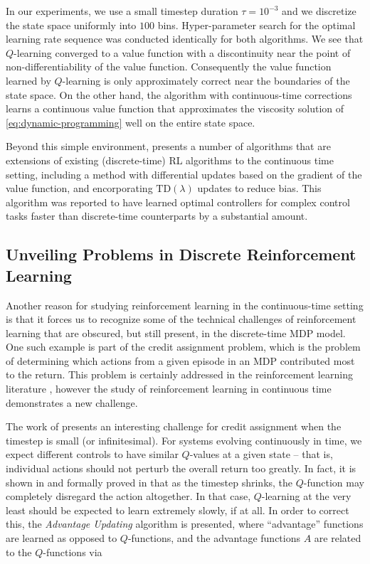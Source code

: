 In our experiments, we use a small timestep duration $\tau=10^{-3}$
and we discretize the state space uniformly into $100$
bins. Hyper-parameter search for the optimal learning rate sequence
was conducted identically for both algorithms. We see that
$Q$-learning converged to a value function with a discontinuity near
the point of non-differentiability of the value function. Consequently
the value function learned by $Q$-learning is only approximately
correct near the boundaries of the state space. On the other hand, the
algorithm with continuous-time corrections learns a continuous value
function that approximates the viscosity solution of
\eqref{eq:dynamic-programming} well on the entire state space.

Beyond this simple environment, \citet{doya2000reinforcement} presents
a number of algorithms that are extensions of existing (discrete-time)
RL algorithms to the continuous time setting, including a method with
differential updates based on the gradient of the value function, and
encorporating $\text{TD}(\lambda)$ updates \citep{sutton1988learning}
to reduce bias. This algorithm was reported to have learned optimal
controllers for complex control tasks faster than discrete-time
counterparts by a substantial amount.

\subsection{Unveiling Problems in Discrete Reinforcement Learning}
Another reason for studying reinforcement learning in the
continuous-time setting is that it forces us to recognize some of the
technical challenges of reinforcement learning that are obscured, but
still present, in the discrete-time MDP model. One such example is 
part of the credit assignment problem, which is the problem of
determining which actions from a given episode in an MDP contributed
most to the return. This problem is certainly addressed in the
reinforcement learning literature \citep{sutton1984temporal,
  arumugam2021information}, however the study of reinforcement
learning in continuous time demonstrates a new challenge.

The work of \citet{baird1993advantage} presents an interesting
challenge for credit assignment when the timestep is small (or
infinitesimal). For systems evolving continuously in time, we expect
different controls to have similar $Q$-values at a given state -- that
is, individual actions should not perturb the overall return too
greatly. In fact, it is shown in \citet{baird1993advantage} and
formally proved in \citet{tallec2019making} that as
the timestep shrinks, the $Q$-function may completely disregard the
action altogether. In that case, $Q$-learning at the very least should
be expected to learn extremely slowly, if at all. In order to correct
this, the \emph{Advantage Updating} algorithm is presented, where
``advantage'' functions are learned as opposed to $Q$-functions, and
the advantage functions $A$ are related to the $Q$-functions via

